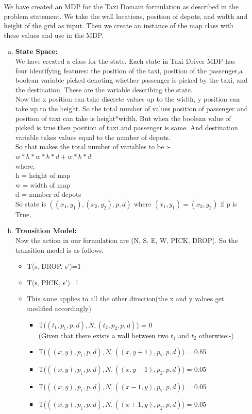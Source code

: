\documentclass{article}
\begin{document}
We have created an MDP for the Taxi Domain formulation as described in the problem statement. We take the wall locations, position of depots, and width and height of the grid as input. Then we create an instance of the map class with these values and use in the MDP.
\begin{enumerate}[a)]
    \item
\textbf{State Space:\\}
We have created a class for the state. Each state in Taxi Driver MDP has four identifying features: the position of the taxi, position of the passenger,a boolean variable picked denoting whether passenger is picked by the taxi, and the destination. These are the variable describing the state.\\
Now the x position can take discrete values up to the width, y position can take up to the height. So the total number of values position of passenger and position of taxi can take is height*width. But when the boolean value of picked is true then position of taxi and passenger is same. And destination variable takes values equal to the number of depots. \\

So that makes the total number of variables to be :- \\
$w*h*w*h*d+w*h*d$\\ where,\\
h = height of map\\
w = width of map\\
d = number of depots\\
So state is $((x_1,y_1),(x_2,y_2),p,d)$ where $(x_1,y_1) = (x_2,y_2)$ if p is True.

\pagebreak

\item
\textbf{Transition Model: \\}Now the action in our formulation are (N, S, E, W, PICK, DROP). So the transition model is as follows.
\begin{itemize}
    \item T(s, DROP, s')=1
    \item T(s, PICK, s')=1
    \item This same applies to all the other direction(the x and y values get modified accordingly)
    \begin{itemize}
        \item T($(t_1,p_1,p,d),N,(t_2,p_2,p,d)$) = 0\\
        (Given that there exists a wall between two $t_1$ and $t_2$ otherwise:-)  
        \item T($((x,y),p_1,p,d),N,((x,y+1),p_2,p,d)$) = 0.85
        \item T($((x,y),p_1,p,d),N,((x,y-1),p_2,p,d)$) = 0.05
        \item T($((x,y),p_1,p,d),N,((x-1,y),p_2,p,d)$) = 0.05
        \item T($((x,y),p_1,p,d),N,((x+1,y),p_2,p,d)$) = 0.05
    \end{itemize}


\end{itemize}
\end{enumerate}
\end{document}
